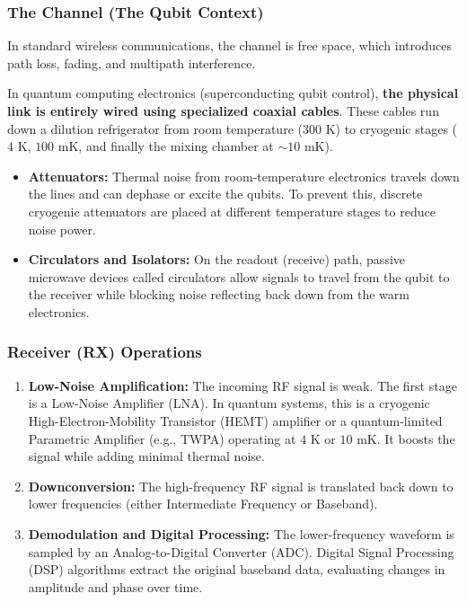 \documentclass[
]{article}
\providecommand{\tightlist}{%
  \setlength{\itemsep}{0pt}\setlength{\parskip}{0pt}}
\begin{document}
\subsubsection{The Channel (The Qubit
Context)}\label{the-channel-the-qubit-context}

In standard wireless communications, the channel is free space, which
introduces path loss, fading, and multipath interference.

In quantum computing electronics (superconducting qubit control),
\textbf{the physical link is entirely wired using specialized coaxial
cables}. These cables run down a dilution refrigerator from room
temperature (\(300\text{ K}\)) to cryogenic stages (\(4\text{ K}\),
\(100\text{ mK}\), and finally the mixing chamber at
\(\sim10\text{ mK}\)).

\begin{itemize}
\tightlist
\item
  \textbf{Attenuators:} Thermal noise from room-temperature electronics
  travels down the lines and can dephase or excite the qubits. To
  prevent this, discrete cryogenic attenuators are placed at different
  temperature stages to reduce noise power.
\item
  \textbf{Circulators and Isolators:} On the readout (receive) path,
  passive microwave devices called circulators allow signals to travel
  from the qubit to the receiver while blocking noise reflecting back
  down from the warm electronics.
\end{itemize}

\subsubsection{Receiver (RX) Operations}\label{receiver-rx-operations}

\begin{enumerate}
\def\labelenumi{\arabic{enumi}.}
\tightlist
\item
  \textbf{Low-Noise Amplification:} The incoming RF signal is weak. The
  first stage is a Low-Noise Amplifier (LNA). In quantum systems, this
  is a cryogenic High-Electron-Mobility Transistor (HEMT) amplifier or a
  quantum-limited Parametric Amplifier (e.g., TWPA) operating at
  \(4\text{ K}\) or \(10\text{ mK}\). It boosts the signal while adding
  minimal thermal noise.
\item
  \textbf{Downconversion:} The high-frequency RF signal is translated
  back down to lower frequencies (either Intermediate Frequency or
  Baseband).
\item
  \textbf{Demodulation and Digital Processing:} The lower-frequency
  waveform is sampled by an Analog-to-Digital Converter (ADC). Digital
  Signal Processing (DSP) algorithms extract the original baseband data,
  evaluating changes in amplitude and phase over time.
\end{enumerate}
\end{document}

